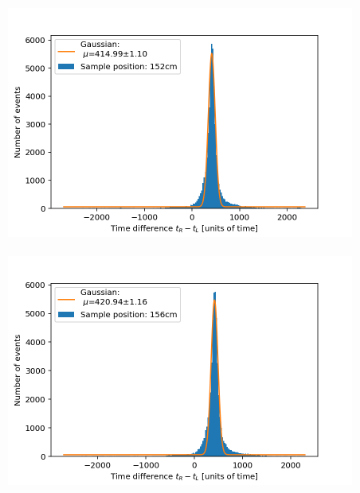 \documentclass[]{article}
\begin{document}
\begin{figure}[H]
\centering
\medskip
\begin{subfigure}{0.48\textwidth}
\includegraphics[width=\linewidth]{Plots/Pos/152cm.png}
\end{subfigure}
\begin{subfigure}[c]{0.48\linewidth}
\includegraphics[width=\linewidth]{Plots/Pos/156cm.png}
\end{subfigure}


\end{figure}
\end{document}

